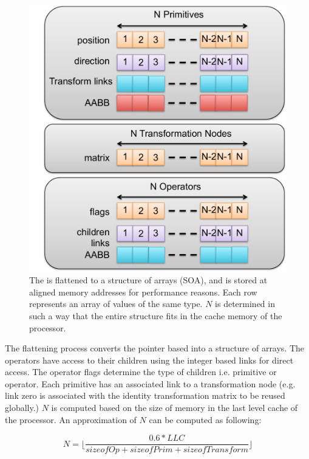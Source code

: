 \begin{figure}[H]
  \centering
  \includegraphics[width=0.9\linewidth]{figures/cpupoly/blob_linearized.pdf}
  \caption{\label{fig:linearized_blobtree}
  {The \blob is flattened to a structure of arrays (SOA), and is stored at aligned memory addresses for performance
  reasons. Each row represents an array of values of the same type. $N$ is determined in such a way that the entire structure 
  fits in the cache memory of the processor. }
}
\end{figure}

The flattening process converts the pointer based \blob into a structure of 
arrays. The operators have access to their children using the integer based 
links for direct access. The operator flags determine the type of children i.e. primitive or operator. 
Each primitive has an associated link to a transformation node (e.g. link zero is associated with the identity 
transformation matrix to be reused globally.) $N$ is computed based on the size 
of memory in the last level cache of the processor. An approximation of $N$ can 
be computed as following: 

\begin{equation}
N = \lfloor \frac{0.6 * LLC}{sizeofOp + sizeofPrim + sizeofTransform} \rfloor
\end{equation}

